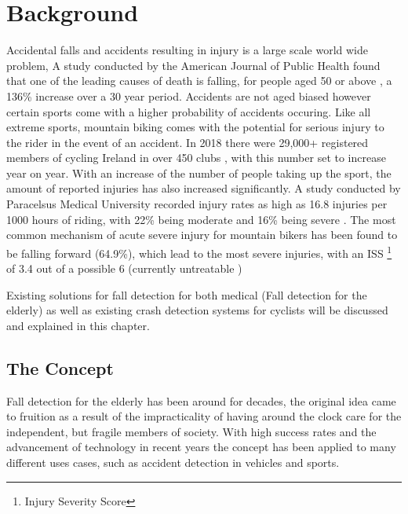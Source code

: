 \chapter{Background}
Accidental falls and accidents resulting in injury is a large scale world wide problem, A study conducted by the American Journal of Public Health found that one of the leading causes of death is falling, for people aged 50 or above , a 136\% increase over a 30 year period\cite{fallDeaths}.  Accidents are not aged biased however certain sports come with a higher probability of accidents occuring.
Like all extreme sports, mountain biking comes with the potential for serious injury to the rider in the event of an accident. In 2018 there were 29,000+ registered members of cycling Ireland in over 450 clubs \cite{IT1} , with this number set to increase year on year. With an increase of the number of people taking up the sport, the amount of reported injuries has also increased significantly.  A study conducted by Paracelsus Medical University recorded injury rates as high as 16.8 injuries per 1000 hours of riding, with 22\% being moderate and 16\% being severe \cite{studyOfMTBInjuries}. The most common mechanism of acute severe injury for mountain bikers has been found to be  falling forward (64.9\%), which lead to the most severe injuries, with an ISS \footnote{ Injury Severity Score} of 3.4 out of a possible 6 (currently untreatable ) \cite{InjuryScale}


Existing solutions for fall detection for both medical (Fall detection for the elderly) as well as existing crash detection systems for cyclists will be discussed and explained in this chapter.

\newpage
\section{The Concept}

Fall detection for the elderly has been around for decades, the original idea came to fruition as a result of the impracticality of having around the clock care for the independent, but fragile members of society. With high success rates and the advancement of technology in recent years the concept has been applied to many different uses cases, such as accident detection in vehicles and sports. 


